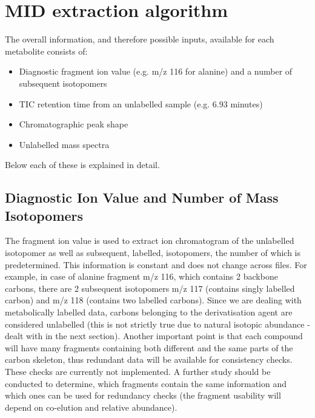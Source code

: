 \begin{verbatim}

\end{verbatim}

\section
{MID extraction algorithm}

\noindent

The overall information, and therefore possible inputs, available for each
metabolite consists of:

\begin{itemize}
\item Diagnostic fragment ion value (e.g. m/z 116 for alanine) and a number
of subsequent isotopomers
\item TIC retention time from an unlabelled sample (e.g. 6.93 minutes)
\item Chromatographic peak shape
\item Unlabelled mass spectra
\end{itemize}

Below each of these is explained in detail.

\subsection{Diagnostic Ion Value and Number of Mass Isotopomers}

The fragment ion value is used to extract ion chromatogram of the unlabelled 
isotopomer as well as subsequent, labelled, isotopomers, the number of which is 
predetermined. This information is constant and does not change across files. 
For example, in case of alanine fragment m/z 116, which contains 2 backbone 
carbons, there are 2 subsequent isotopomers m/z 117 (contains singly labelled 
carbon) and m/z 118 (contains two labelled carbons). Since we are dealing with 
metabolically labelled data, carbons belonging to the derivatisation agent are 
considered unlabelled (this is not strictly true due to natural isotopic 
abundance - dealt with in the next section).  Another important point is that 
each compound will have many fragments containing both different and the same 
parts of the carbon skeleton, thus redundant data will be available for 
consistency checks. These checks are currently not implemented. A further study 
should be conducted to determine, which fragments contain the same information 
and which ones can be used for redundancy checks (the fragment usability will 
depend on co-elution and relative abundance).

